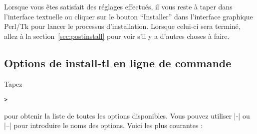 \documentclass[german, english, french]{article}
\begin{document}
Lorsque vous êtes satisfait des réglages effectués, il vous reste à taper
 dans l'interface textuelle ou cliquer sur le bouton \enquote{Installer}
dans l'interface graphique Perl/Tk pour lancer le processus d'installation.
Lorsque celui-ci sera terminé, allez à la section~\ref{sec:postinstall} pour
voir s'il y a d'autres choses à faire.

\subsection{Options de install-tl en ligne de commande}
\label{sec:cmdline}

Tapez
\begin{alltt}
> 
\end{alltt}
pour obtenir la liste de toutes les options disponibles. Vous pouvez utiliser
|-| ou |--| pour introduire le noms des options.  Voici les plus courantes :
\end{document}
